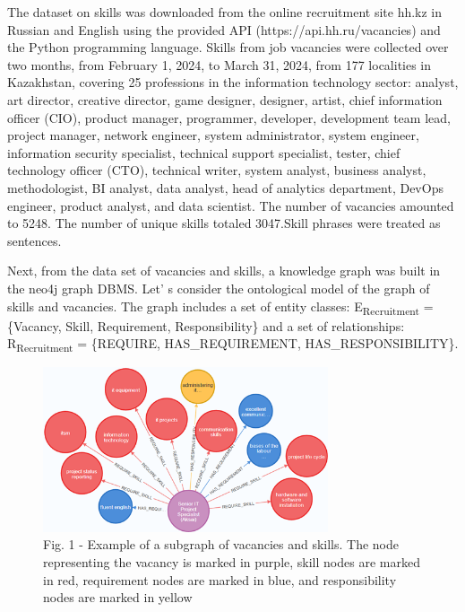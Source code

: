 \begin{multicols}{2}
The dataset on skills was downloaded from the online recruitment site
hh.kz in Russian and English using the provided API
(https://api.hh.ru/vacancies) and the Python programming language.
Skills from job vacancies were collected over two months, from February
1, 2024, to March 31, 2024, from 177 localities in Kazakhstan, covering
25 professions in the information technology sector: analyst, art
director, creative director, game designer, designer, artist, chief
information officer (CIO), product manager, programmer, developer,
development team lead, project manager, network engineer, system
administrator, system engineer, information security specialist,
technical support specialist, tester, chief technology officer (CTO),
technical writer, system analyst, business analyst, methodologist, BI
analyst, data analyst, head of analytics department, DevOps engineer,
product analyst, and data scientist. The number of vacancies amounted to
5248. The number of unique skills totaled 3047.Skill phrases were
treated as sentences.

Next, from the data set of vacancies and skills, a knowledge graph was
built in the neo4j graph DBMS. Let' s consider the
ontological model of the graph of skills and vacancies. The graph
includes a set of entity classes: E\textsubscript{Recruitment} =
\{Vacancy, Skill, Requirement, Responsibility\} and a set of
relationships: R\textsubscript{Recruitment} = \{REQUIRE,
HAS\_REQUIREMENT, HAS\_RESPONSIBILITY\}.
\end{multicols}

\begin{figure}[H]
	\centering
	\includegraphics[width=0.75\textwidth]{media/ict/image104}
	\caption*{Fig. 1 - Example of a subgraph of vacancies and skills. The
node representing the vacancy is marked in purple, skill nodes are
marked in red, requirement nodes are marked in blue, and responsibility
nodes are marked in yellow}
\end{figure}

